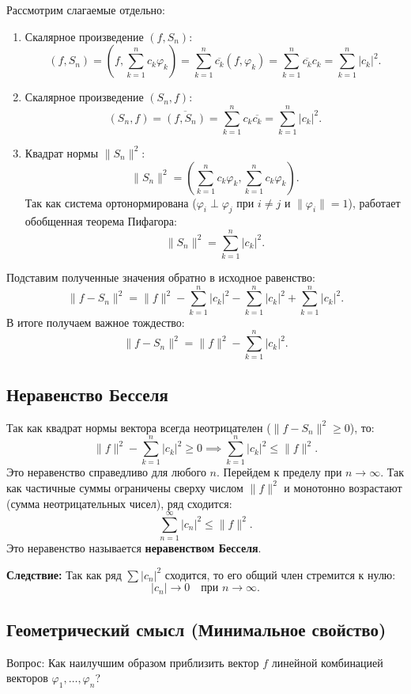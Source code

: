 \documentclass[12pt,a4paper,openany]{book}
\begin{document}
Рассмотрим слагаемые отдельно:
\begin{enumerate}
    \item Скалярное произведение $(f, S_n)$:
    \[
    (f, S_n) = \left( f, \sum_{k=1}^n c_k \varphi_k \right) = \sum_{k=1}^n \overline{c_k} (f, \varphi_k) = \sum_{k=1}^n \overline{c_k} c_k = \sum_{k=1}^n |c_k|^2.
    \]
    
    \item Скалярное произведение $(S_n, f)$:
    \[
    (S_n, f) = \overline{(f, S_n)} = \sum_{k=1}^n c_k \overline{c_k} = \sum_{k=1}^n |c_k|^2.
    \]
    
    \item Квадрат нормы $\|S_n\|^2$:
    \[
    \|S_n\|^2 = \left( \sum_{k=1}^n c_k \varphi_k, \sum_{k=1}^n c_k \varphi_k \right).
    \]
    Так как система ортонормирована ($\varphi_i \perp \varphi_j$ при $i \neq j$ и $\|\varphi_i\|=1$), работает обобщенная теорема Пифагора:
    \[
    \|S_n\|^2 = \sum_{k=1}^n |c_k|^2.
    \]
\end{enumerate}

Подставим полученные значения обратно в исходное равенство:
\[
\|f - S_n\|^2 = \|f\|^2 - \sum_{k=1}^n |c_k|^2 - \sum_{k=1}^n |c_k|^2 + \sum_{k=1}^n |c_k|^2.
\]
В итоге получаем важное тождество:
\[
\|f - S_n\|^2 = \|f\|^2 - \sum_{k=1}^n |c_k|^2.
\]

\subsection{Неравенство Бесселя}

Так как квадрат нормы вектора всегда неотрицателен ($\|f - S_n\|^2 \ge 0$), то:
\[
\|f\|^2 - \sum_{k=1}^n |c_k|^2 \ge 0 \implies \sum_{k=1}^n |c_k|^2 \le \|f\|^2.
\]
Это неравенство справедливо для любого $n$. Перейдем к пределу при $n \to \infty$. Так как частичные суммы ограничены сверху числом $\|f\|^2$ и монотонно возрастают (сумма неотрицательных чисел), ряд сходится:
\[
\sum_{n=1}^\infty |c_n|^2 \le \|f\|^2.
\]
Это неравенство называется \textbf{неравенством Бесселя}.

\textbf{Следствие:}
Так как ряд $\sum |c_n|^2$ сходится, то его общий член стремится к нулю:
\[
|c_n| \to 0 \quad \text{при } n \to \infty.
\]

\subsection{Геометрический смысл (Минимальное свойство)}

Вопрос: Как наилучшим образом приблизить вектор $f$ линейной комбинацией векторов $\varphi_1, \dots, \varphi_n$?
\end{document}
